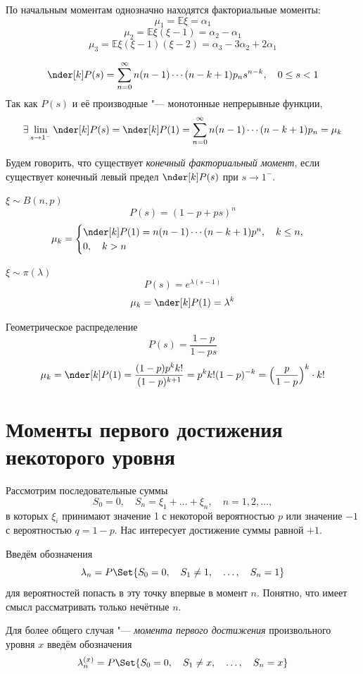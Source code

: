По начальным моментам однозначно находятся факториальные моменты:
$$ \mu_1 = \mathbb E \xi = \alpha_1 $$
$$ \mu_2 = \mathbb E \xi (\xi - 1) = \alpha_2 - \alpha_1 $$
$$ \mu_3 = \mathbb E \xi (\xi - 1) (\xi - 2) = \alpha_3 - 3\alpha_2 + 2\alpha_1 $$

$$ \nder[k]P(s) = \sum_{n = 0}^\infty n (n - 1) \cdots (n - k + 1) p_ns^{n - k}, \quad 0 \le s < 1 $$
Так как $ P(s) $ и её производные "--- монотонные непрерывные функции,
$$ \exists \lim\limits_{s \to 1^-} \nder[k]P(s) = \nder[k]P(1) =
\sum_{n = 0}^\infty n (n - 1) \cdots (n - k + 1)p_n = \mu_k $$

Будем говорить, что существует \emph{конечный факториальный момент}, если существует конечный левый
предел $ \nder[k]P(s) $ при $ s \to 1^- $.

\begin{exmpls}
\item $ \xi \sim B(n, p) $
	$$ P(s) = (1 - p + ps)^n $$
	$$ \mu_k =
	\begin{cases}
		\nder[k]P(1) = n(n - 1) \cdots (n - k + 1)p^n, \quad k \le n, \\
		0, \quad k > n
	\end{cases} $$
\item $ \xi \sim \pi(\lambda) $
	$$ P(s) = e^{\lambda(s - 1)} $$
	$$ \mu_k = \nder[k]P(1) = \lambda^k $$
\item Геометрическое распределение
	$$ P(s) = \frac{1 - p}{1 - ps} $$
	$$ \mu_k = \nder[k]P(1) = \frac{(1 - p)p^k k!}{(1 - p)^{k + 1}} = p^k k! (1 - p)^{-k} =
	\Bigl( \frac{p}{1 - p} \Bigr)^k \cdot k! $$
\end{exmpls}

\section{Моменты первого достижения некоторого уровня}

Рассмотрим последовательные суммы
$$ S_0 = 0, \quad S_n = \xi_1 + \dots + \xi_n, \quad n = 1, 2, \dots, $$
в которых $ \xi_i $ принимают значение 1 с некоторой вероятностью $ p $ или значение $ -1 $ с
вероятностью $ q = 1 - p $.
Нас интересует достижение суммы равной $ +1 $.

Введём обозначения
$$ \lambda_n = P\Set{S_0 = 0, \quad S_1 \ne 1, \quad \dots, \quad S_n = 1} $$
для вероятностей попасть в эту точку впервые в момент $ n $.
Понятно, что имеет смысл рассматривать только нечётные $ n $.

Для более общего случая "--- \emph{момента первого достижения} произвольного уровня $ x $ введём
обозначения
$$ \lambda_n^{(x)} = P\Set{S_0 = 0, \quad S_1 \ne x, \quad \dots, \quad S_n = x} $$

